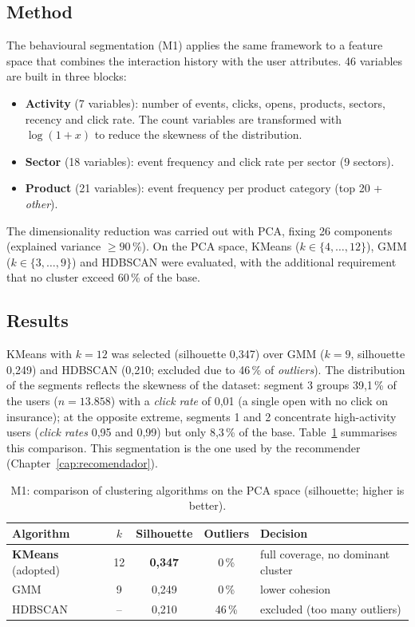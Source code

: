 \subsection{Method}

The behavioural segmentation (M1) applies the same framework to a feature space that combines the interaction history with the user attributes. 46 variables are built in three blocks:
\begin{itemize}
    \item \textbf{Activity} (7 variables): number of events, clicks, opens, products, sectors, recency and click rate. The count variables are transformed with $\log(1+x)$ to reduce the skewness of the distribution.
    \item \textbf{Sector} (18 variables): event frequency and click rate per sector (9 sectors).
    \item \textbf{Product} (21 variables): event frequency per product category (top 20 + \textit{other}).
\end{itemize}
The dimensionality reduction was carried out with PCA, fixing 26 components (explained variance $\geq 90$\,\%). On the PCA space, KMeans ($k \in \{4,\ldots,12\}$), GMM ($k \in \{3,\ldots,9\}$) and HDBSCAN were evaluated, with the additional requirement that no cluster exceed 60\,\% of the base.

\subsection{Results}

KMeans with $k=12$ was selected (silhouette 0,347) over GMM ($k=9$, silhouette 0,249) and HDBSCAN (0,210; excluded due to 46\,\% of \textit{outliers}). The distribution of the segments reflects the skewness of the dataset: segment 3 groups 39,1\,\% of the users ($n=13.858$) with a \textit{click rate} of 0,01 (a single open with no click on insurance); at the opposite extreme, segments 1 and 2 concentrate high-activity users (\textit{click rates} 0,95 and 0,99) but only 8,3\,\% of the base. Table~\ref{tab:m1_algos} summarises this comparison. This segmentation is the one used by the recommender (Chapter~\ref{cap:recomendador}).

\begin{table}[htbp]
\centering
\caption{M1: comparison of clustering algorithms on the PCA space (silhouette; higher is better).}
\label{tab:m1_algos}
\small
\begin{tabular}{lcccl}
\toprule
\textbf{Algorithm} & \textbf{$k$} & \textbf{Silhouette} & \textbf{Outliers} & \textbf{Decision} \\
\midrule
\textbf{KMeans} (adopted) & 12 & \textbf{0,347} & 0\,\%  & full coverage, no dominant cluster \\
GMM                       & 9  & 0,249          & 0\,\%  & lower cohesion \\
HDBSCAN                   & -- & 0,210          & 46\,\% & excluded (too many outliers) \\
\bottomrule
\end{tabular}
\end{table}
